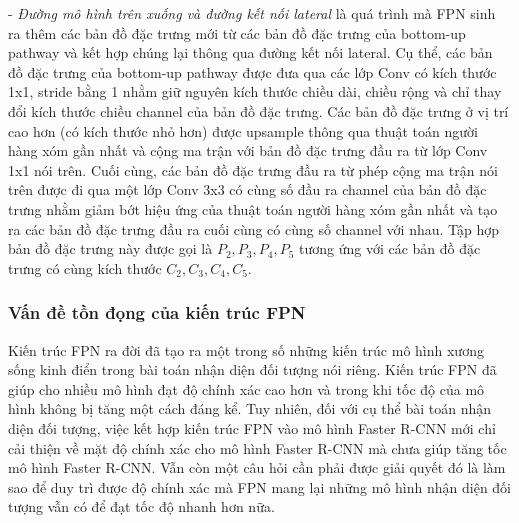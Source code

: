 {    \noindent
    - \textit{Đường mô hình trên xuống và đường kết nối lateral} là quá trình mà FPN sinh ra thêm các bản đồ đặc trưng mới từ các bản đồ đặc trưng của bottom-up pathway và kết hợp chúng lại thông qua đường kết nối lateral.
    Cụ thể, các bản đồ đặc trưng của bottom-up pathway được đưa qua các lớp Conv có kích thước 1x1, stride bằng 1 nhằm giữ nguyên kích thước chiều dài, chiều rộng và chỉ thay đổi kích thước chiều channel của bản đồ đặc trưng.
    Các bản đồ đặc trưng ở vị trí cao hơn (có kích thước nhỏ hơn) được upsample thông qua thuật toán người hàng xóm gần nhất và cộng ma trận với bản đồ đặc trưng đầu ra từ lớp Conv 1x1 nói trên.
    Cuối cùng, các bản đồ đặc trưng đầu ra từ phép cộng ma trận nói trên được đi qua một lớp Conv 3x3 có cùng số đầu ra channel của bản đồ đặc trưng nhằm giảm bớt hiệu ứng của thuật toán người hàng xóm gần nhất và tạo ra các bản đồ đặc trưng đầu ra cuối cùng có cùng số channel với nhau.
    Tập hợp bản đồ đặc trưng này được gọi là \textit{{${P}_{2}, {P}_{3}, {P}_{4}, {P}_{5}$}} tương ứng với các bản đồ đặc trưng có cùng kích thước \textit{{${C}_{2}, {C}_{3}, {C}_{4}, {C}_{5}$}}.

    \subsubsection*{Vấn đề tồn đọng của kiến trúc FPN}
    Kiến trúc FPN ra đời đã tạo ra một trong số những kiến trúc mô hình xương sống kinh điển trong bài toán nhận diện đối tượng nói riêng.
    Kiến trúc FPN đã giúp cho nhiều mô hình đạt độ chính xác cao hơn và trong khi tốc độ của mô hình không bị tăng một cách đáng kể.
    Tuy nhiên, đối với cụ thể bài toán nhận diện đối tượng, việc kết hợp kiến trúc FPN vào mô hình Faster R-CNN mới chỉ cải thiện về mặt độ chính xác cho mô hình Faster R-CNN mà chưa giúp tăng tốc mô hình Faster R-CNN.
    Vẫn còn một câu hỏi cần phải được giải quyết đó là làm sao để duy trì được độ chính xác mà FPN mang lại những mô hình nhận diện đối tượng vẫn có để đạt tốc độ nhanh hơn nữa.
}